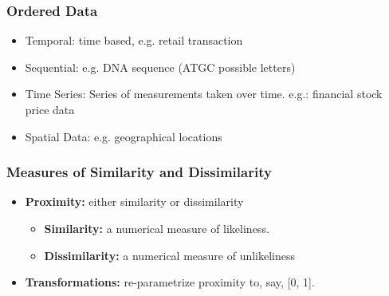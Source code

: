 



\begin{frame}[fragile]\frametitle{Ordered Data}	

\begin{itemize}
\item Temporal: time based, e.g. retail transaction
\item Sequential: e.g. DNA sequence (ATGC possible letters)
\item Time Series: Series of measurements taken over time. e.g.: financial stock price data
\item Spatial Data: e.g. geographical locations
\end{itemize}
\end{frame}

\begin{frame}[fragile]\frametitle{Measures of Similarity and Dissimilarity}

	\begin{itemize}
		\item {\bf Proximity:} either similarity or dissimilarity
			\begin{itemize}
		\item {\bf Similarity:} a numerical measure of likeliness.
		\item{\bf Dissimilarity:} a numerical measure of unlikeliness
		\end{itemize}
		\item {\bf Transformations:} re-parametrize proximity to, say, [0, 1].
\end{itemize}
\end{frame}

